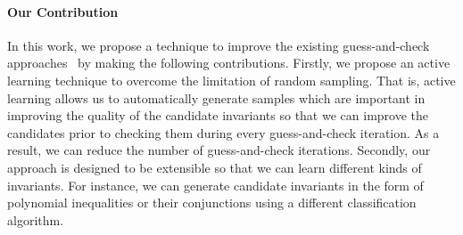 \paragraph{Our Contribution} In this work, we propose a technique to improve the existing guess-and-check approaches~\cite{sharma2012interpolants,sharma2013verification,DBLP:conf/esop/0001GHALN13,sharma2014invariant}
by making the following contributions.
Firstly, we propose an active learning technique to overcome the limitation of random sampling.
That is, active learning allows us to automatically generate samples which are important in improving the quality of the candidate invariants
so that we can improve the candidates prior to checking them during every guess-and-check iteration.
As a result, we can reduce the number of guess-and-check iterations. %
Secondly, our approach is designed to be extensible so that we can learn different kinds of invariants.
For instance, we can generate candidate invariants in the form of polynomial inequalities or their conjunctions using a different classification algorithm.
